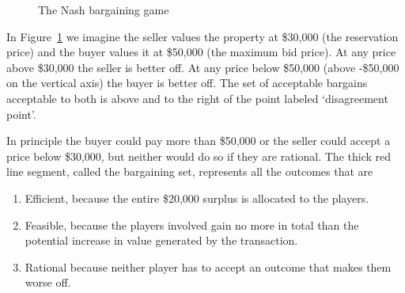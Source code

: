 {    \begin{figure}
        \centering
        
        \caption{The Nash bargaining game}
        \label{fig:Nash-bargaining-game}
    \end{figure}


In Figure~\ref{fig:Nash-bargaining-game} we imagine the seller values the property at \$30,000 (the reservation price) and the buyer values it at \$50,000 (the maximum bid price).  At any price above \$30,000 the seller is better off. At any price below \$50,000 (above -\$50,000 on the vertical axis) the buyer is better off. 
The set of acceptable bargains acceptable to both is above and to the right of the point labeled `disagreement point'. 

In principle the buyer could pay more than \$50,000 or the seller could accept a price below \$30,000, but neither would do so if they are rational. 
The thick red line segment, called the bargaining set, represents all the outcomes that are\begin{enumerate}
    \item Efficient, because the entire \$20,000 surplus is allocated to the players. 
    \item Feasible, because the players involved gain no more in total than the potential increase in value generated by the transaction.
    \item Rational because neither player has to accept an outcome that makes them worse off.
\end{enumerate}   

}
